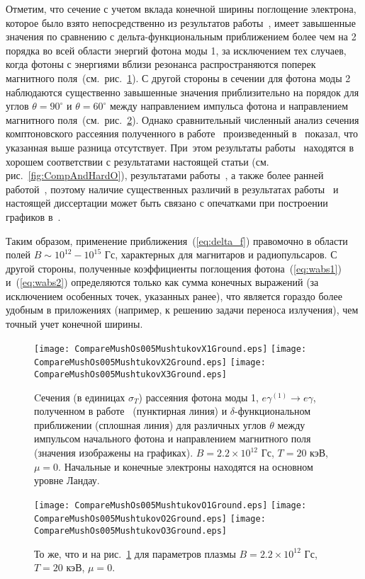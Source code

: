 Отметим, что сечение с учетом вклада конечной ширины поглощение электрона, которое было взято непосредственно из результатов работы~\cite{Mushtukov:2016}, имеет завышенные значения по сравнению с дельта-функциональным приближением более чем на 2 порядка во всей области энергий фотона моды 1, за исключением тех случаев, когда фотоны с энергиями вблизи резонанса распространяются поперек магнитного поля~(см.~рис.~\ref{fig:CompAndMushXGround}).  С другой стороны в сечении для фотона моды 2 наблюдаются существенно завышенные значения приблизительно на порядок для углов $\theta=90^\circ$ и $\theta=60^\circ$ между направлением импульса фотона и направлением магнитного поля~(см.~рис.~\ref{fig:CompAndMushO}). Однако сравнительный численный анализ сечения комптоновского рассеяния полученного в работе~\cite{Mushtukov:2016} произведенный в~\cite{SchwarmD:2017} показал, что указанная выше разница отсутствует. При~этом результаты работы~\cite{SchwarmD:2017} находятся в хорошем соответствии с результатами настоящей статьи (см. рис.~\ref{fig:CompAndHardO}), результатами работы~\cite{Harding:1986}, а также более ранней работой~\cite{Mushtukov:2015}, поэтому наличие существенных различий в результатах работы~\cite{Mushtukov:2016} и настоящей диссертации может быть связано с опечатками при построении графиков в~\cite{Mushtukov:2016}.

Таким образом, применение 
приближения~(\ref{eq:delta_f}) правомочно  в области полей $B \sim 10^{12}-10^{15}$ Гс, характерных для магнитаров и радиопульсаров. С другой стороны, полученные коэффициенты поглощения фотона~(\ref{eq:wabs1}) и~(\ref{eq:wabs2}) определяются только как сумма конечных выражений (за исключением особенных точек, указанных ранее), что является гораздо более удобным в приложениях (например, к решению задачи переноса излучения), чем точный учет конечной ширины.
\clearpage
\begin{figure}[t!]\centering
	\texttt{[image: CompareMushOs005MushtukovX1Ground.eps]}
	\texttt{[image: CompareMushOs005MushtukovX2Ground.eps]}
	\texttt{[image: CompareMushOs005MushtukovX3Ground.eps]}
	\caption{Cечения (в единицах $\sigma_T$) рассеяния фотона моды 1, $e\gamma^{(1)}  \to e\gamma$, полученном в работе~\cite{Mushtukov:2016} (пунктирная линия) и $\delta$-функциональном приближении (сплошная линия) для различных углов $\theta$ между импульсом начального фотона и направлением магнитного поля (значения изображены на графиках). $B=2.2\times 10^{12}$ Гс, $T = 20$ кэВ, $\mu=0$. Начальные и конечные электроны находятся на основном уровне Ландау.}
	\label{fig:CompAndMushXGround}
\end{figure}
\begin{figure}[t!]\centering
	\texttt{[image: CompareMushOs005MushtukovO1Ground.eps]}
	\texttt{[image: CompareMushOs005MushtukovO2Ground.eps]}
	\texttt{[image: CompareMushOs005MushtukovO3Ground.eps]}
	\caption{То же, что и на рис.~\ref{fig:CompAndMushXGround} для параметров плазмы $B=2.2\times 10^{12}$ Гс, $T = 20$ кэВ, $\mu=0$.}
	\label{fig:CompAndMushO}
\end{figure}
\clearpage




